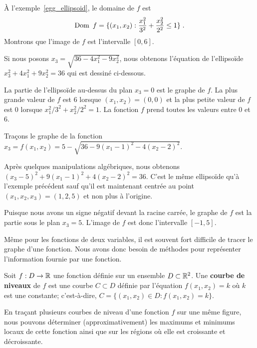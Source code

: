 {\begin{egg}
À l'exemple~\ref{egg_ellipsoid}, le domaine de $f$ est
\[
\DO f = \{ (x_1,x_2) : \frac{x_1^2}{3^2} + \frac{x_2^2}{2^2} \leq 1 \} \; .
\]
Montrons que l'image de $f$ est l'intervalle $[0,6]$.

Si nous posons $x_3 = \sqrt{36-4x_1^2-9x_2^2}$, nous obtenons l'équation de
l'ellipsoïde $x_3^2 + 4x_1^2 + 9x_2^2 = 36$ qui est dessiné ci-dessous.

La partie de l'ellipsoïde au-dessus du plan $x_3=0$ est le graphe de
$f$.  La plus grande valeur de $f$ est $6$ lorsque $(x_1,x_2)=(0,0)$ et la
plus petite valeur de $f$ est $0$ lorsque $x_1^2/3^2 + x_2^2/2^2 = 1$.  La
fonction $f$ prend toutes les valeurs entre $0$ et $6$.
\end{egg}

\begin{egg}
Traçons le graphe de la fonction
$x_3 = f(x_1,x_2) = 5 - \sqrt{36 - 9(x_1-1)^2 - 4(x_2-2)^2}$.

Après quelques manipulations algébriques, nous obtenons
$(x_3 - 5)^2 + 9(x_1-1)^2 + 4(x_2-2)^2 = 36$.  C'est le même
ellipsoïde qu'à l'exemple précédent sauf qu'il est maintenant centrée
au point $(x_1,x_2,x_3) = (1,2,5)$ et non plus à l'origine.

Puisque nous avons un signe négatif devant la racine carrée, le graphe de
$f$ est la partie sous le plan $x_3 = 5$.   L'image de $f$ est donc
l'intervalle $[-1,5]$.
\end{egg}

Même pour les fonctions de deux variables, il est souvent fort
difficile de tracer le graphe d'une fonction.  Nous avons donc besoin de
méthodes pour représenter l'information fournie par une fonction.

\begin{defn} 
Soit $f:D\rightarrow \mathbb{R}$ une fonction définie sur un ensemble
$D\subset \mathbb{R}^2$.  Une {\bfseries courbe de niveaux} de $f$ est une
courbe $C \subset D$ définie par l'équation $f(x_1,x_2) = k$ où $k$
est une constante; c'est-à-dire,
$\displaystyle C = \{ (x_1,x_2) \in D : f(x_1,x_2) = k \}$.
\end{defn}

En traçant plusieurs courbes de niveau d'une fonction $f$ sur une
même figure, nous pouvons déterminer (approximativement) les maximums
et minimums locaux de cette fonction ainsi que sur les régions où elle
est croissante et décroissante.

}
